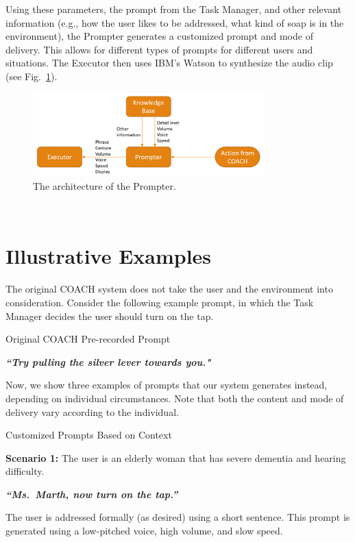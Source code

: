 \documentclass[11pt,a4paper, final, twoside]{article}
\theoremstyle{proposition}
\theoremstyle{definition}
\theoremstyle{remark}
\numberwithin{equation}{section}
\begin{document}
Using these parameters, the prompt from the Task Manager, and other relevant information (e.g., how the user likes to be addressed, what kind of soap is in the environment), the Prompter generates a customized prompt and mode of delivery. This allows for different types of prompts for different users and situations.
The Executor then uses IBM's Watson to synthesize the audio clip (see Fig.~\ref{fig:arch}). 
\begin{figure}[h!]
    \centering
    \includegraphics[width=0.8\textwidth]{prompter.png}
    \caption{The architecture of the Prompter.}
    \label{fig:arch}
\end{figure}\\

\section{Illustrative Examples}\label{I4}
The original COACH system does not take the user and the environment into consideration.
Consider the following example prompt, in which the Task Manager decides the user should turn on the tap.
\begin{center}
{\color{red} Original COACH Pre-recorded Prompt}
\end{center}
\begin{center}
\textbf{\textit{``Try pulling the silver lever towards you."}}
\end{center}
\noindent Now, we show three examples of prompts that our system generates instead, depending on individual circumstances. Note that both the content and mode of delivery vary according to the individual.
\begin{center}
    {\color{red}Customized Prompts Based on Context}
\end{center}

{\bf Scenario 1:} The user is an elderly woman that has severe dementia and hearing difficulty.
\begin{center}
\textbf{\textit{``Ms.\ Marth, now turn on the tap.''}}
\end{center}
The user is addressed formally (as desired) using a short sentence.  This prompt is generated using a
low-pitched voice, high volume, and slow speed.\\
\end{document}
